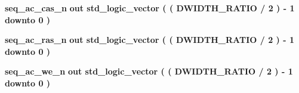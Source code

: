 \begin{DoxyCompactItemize}
\item 
{\bf seq\+\_\+ac\+\_\+cas\+\_\+n}  {\bfseries {\bfseries \textcolor{keywordflow}{out}\textcolor{vhdlchar}{ }}} {\bfseries \textcolor{comment}{std\+\_\+logic\+\_\+vector}\textcolor{vhdlchar}{ }\textcolor{vhdlchar}{(}\textcolor{vhdlchar}{ }\textcolor{vhdlchar}{(}\textcolor{vhdlchar}{ }\textcolor{vhdlchar}{ }\textcolor{vhdlchar}{ }\textcolor{vhdlchar}{ }{\bfseries {\bf D\+W\+I\+D\+T\+H\+\_\+\+R\+A\+T\+IO}} \textcolor{vhdlchar}{/}\textcolor{vhdlchar}{ } \textcolor{vhdldigit}{2} \textcolor{vhdlchar}{ }\textcolor{vhdlchar}{)}\textcolor{vhdlchar}{ }\textcolor{vhdlchar}{-\/}\textcolor{vhdlchar}{ } \textcolor{vhdldigit}{1} \textcolor{vhdlchar}{ }\textcolor{keywordflow}{downto}\textcolor{vhdlchar}{ }\textcolor{vhdlchar}{ } \textcolor{vhdldigit}{0} \textcolor{vhdlchar}{ }\textcolor{vhdlchar}{)}\textcolor{vhdlchar}{ }} 
\item 
{\bf seq\+\_\+ac\+\_\+ras\+\_\+n}  {\bfseries {\bfseries \textcolor{keywordflow}{out}\textcolor{vhdlchar}{ }}} {\bfseries \textcolor{comment}{std\+\_\+logic\+\_\+vector}\textcolor{vhdlchar}{ }\textcolor{vhdlchar}{(}\textcolor{vhdlchar}{ }\textcolor{vhdlchar}{(}\textcolor{vhdlchar}{ }\textcolor{vhdlchar}{ }\textcolor{vhdlchar}{ }\textcolor{vhdlchar}{ }{\bfseries {\bf D\+W\+I\+D\+T\+H\+\_\+\+R\+A\+T\+IO}} \textcolor{vhdlchar}{/}\textcolor{vhdlchar}{ } \textcolor{vhdldigit}{2} \textcolor{vhdlchar}{ }\textcolor{vhdlchar}{)}\textcolor{vhdlchar}{ }\textcolor{vhdlchar}{-\/}\textcolor{vhdlchar}{ } \textcolor{vhdldigit}{1} \textcolor{vhdlchar}{ }\textcolor{keywordflow}{downto}\textcolor{vhdlchar}{ }\textcolor{vhdlchar}{ } \textcolor{vhdldigit}{0} \textcolor{vhdlchar}{ }\textcolor{vhdlchar}{)}\textcolor{vhdlchar}{ }} 
\item 
{\bf seq\+\_\+ac\+\_\+we\+\_\+n}  {\bfseries {\bfseries \textcolor{keywordflow}{out}\textcolor{vhdlchar}{ }}} {\bfseries \textcolor{comment}{std\+\_\+logic\+\_\+vector}\textcolor{vhdlchar}{ }\textcolor{vhdlchar}{(}\textcolor{vhdlchar}{ }\textcolor{vhdlchar}{(}\textcolor{vhdlchar}{ }\textcolor{vhdlchar}{ }\textcolor{vhdlchar}{ }\textcolor{vhdlchar}{ }{\bfseries {\bf D\+W\+I\+D\+T\+H\+\_\+\+R\+A\+T\+IO}} \textcolor{vhdlchar}{/}\textcolor{vhdlchar}{ } \textcolor{vhdldigit}{2} \textcolor{vhdlchar}{ }\textcolor{vhdlchar}{)}\textcolor{vhdlchar}{ }\textcolor{vhdlchar}{-\/}\textcolor{vhdlchar}{ } \textcolor{vhdldigit}{1} \textcolor{vhdlchar}{ }\textcolor{keywordflow}{downto}\textcolor{vhdlchar}{ }\textcolor{vhdlchar}{ } \textcolor{vhdldigit}{0} \textcolor{vhdlchar}{ }\textcolor{vhdlchar}{)}\textcolor{vhdlchar}{ }} 

\end{DoxyCompactItemize}
